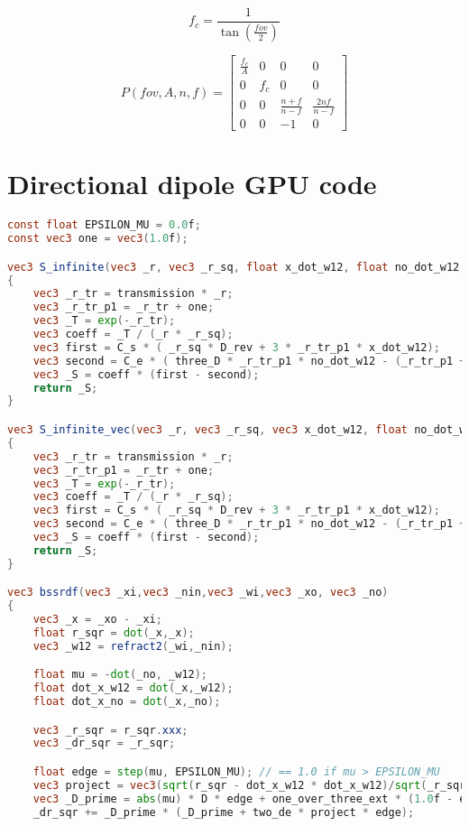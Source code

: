 $$
f_c = \frac{1}{\tan(\frac{fov}{2})}
$$

$$
P(fov,A,n,f) = \left[\begin{array}{cccc}
\frac{f_c}{A} & 0 & 0 & 0       \\
0 & f_c & 0 & 0       \\
0 & 0 & \frac{n + f}{n - f} & \frac{2 n f}{n-f}      \\
0 & 0 & -1 & 0
\end{array}\right]
$$

\chapter{Directional dipole GPU code}

\begin{lstlisting}[language=GLSL,label=lst:l,caption={Directional dipole code optimized for GPU. Uniforms and Fresnel formulas code is not reported.}]
const float EPSILON_MU = 0.0f;
const vec3 one = vec3(1.0f);

vec3 S_infinite(vec3 _r, vec3 _r_sq, float x_dot_w12, float no_dot_w12, float x_dot_no)
{
    vec3 _r_tr = transmission * _r;
    vec3 _r_tr_p1 = _r_tr + one;
    vec3 _T = exp(-_r_tr);
    vec3 coeff = _T / (_r * _r_sq);
    vec3 first = C_s * ( _r_sq * D_rev + 3 * _r_tr_p1 * x_dot_w12);
    vec3 second = C_e * ( three_D * _r_tr_p1 * no_dot_w12 - (_r_tr_p1 + three_D * (3 *_r_tr_p1 + _r_tr * _r_tr) / (_r_sq) * x_dot_w12) * x_dot_no);
    vec3 _S = coeff * (first - second);
    return _S;
}

vec3 S_infinite_vec(vec3 _r, vec3 _r_sq, vec3 x_dot_w12, float no_dot_w12, vec3 x_dot_no)
{
    vec3 _r_tr = transmission * _r;
    vec3 _r_tr_p1 = _r_tr + one;
    vec3 _T = exp(-_r_tr);
    vec3 coeff = _T / (_r * _r_sq);
    vec3 first = C_s * ( _r_sq * D_rev + 3 * _r_tr_p1 * x_dot_w12);
    vec3 second = C_e * ( three_D * _r_tr_p1 * no_dot_w12 - (_r_tr_p1 + three_D * (3 *_r_tr_p1 + _r_tr * _r_tr) / (_r_sq) * x_dot_w12) * x_dot_no);
    vec3 _S = coeff * (first - second);
    return _S;
}

vec3 bssrdf(vec3 _xi,vec3 _nin,vec3 _wi,vec3 _xo, vec3 _no)
{
    vec3 _x = _xo - _xi;
    float r_sqr = dot(_x,_x);
    vec3 _w12 = refract2(_wi,_nin);

    float mu = -dot(_no, _w12);
    float dot_x_w12 = dot(_x,_w12);
    float dot_x_no = dot(_x,_no);

    vec3 _r_sqr = r_sqr.xxx;
    vec3 _dr_sqr = _r_sqr;

    float edge = step(mu, EPSILON_MU); // == 1.0 if mu > EPSILON_MU
    vec3 project = vec3(sqrt(r_sqr - dot_x_w12 * dot_x_w12)/sqrt(_r_sqr + de_sqr));
    vec3 _D_prime = abs(mu) * D * edge + one_over_three_ext * (1.0f - edge);
    _dr_sqr += _D_prime * (_D_prime + two_de * project * edge);


\end{lstlisting}

